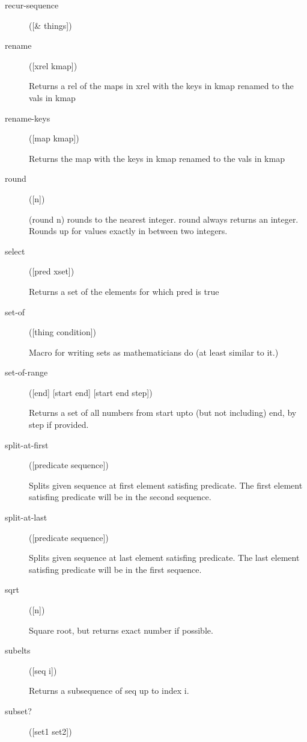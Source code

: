 \begin{description}
  \item[recur-sequence]
([\& things])



  \item[rename]
([xrel kmap])

Returns a rel of the maps in xrel with the keys in kmap renamed to the vals in kmap

  \item[rename-keys]
([map kmap])

Returns the map with the keys in kmap renamed to the vals in kmap

  \item[round]
([n])

(round n) rounds to the nearest integer.
round always returns an integer.  Rounds up for values exactly in between two integers.

  \item[select]
([pred xset])

Returns a set of the elements for which pred is true

  \item[set-of]
([thing condition])

Macro for writing sets as mathematicians do (at least similar to it.)

  \item[set-of-range]
([end] [start end] [start end step])

Returns a set of all numbers from start upto (but not including) end,
  by step if provided.

  \item[split-at-first]
([predicate sequence])

Splits given sequence at first element satisfing predicate.
  The first element satisfing predicate will be in the second sequence.

  \item[split-at-last]
([predicate sequence])

Splits given sequence at last element satisfing predicate.
  The last element satisfing predicate will be in the first sequence.

  \item[sqrt]
([n])

Square root, but returns exact number if possible.

  \item[subelts]
([seq i])

Returns a subsequence of seq up to index i.

  \item[subset?]
([set1 set2])


\end{description}
